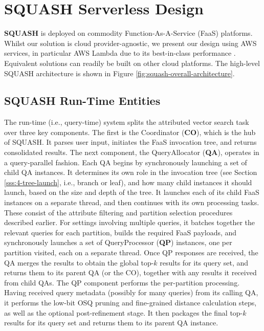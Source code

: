 \section{SQUASH Serverless Design}
\label{s:3-serverless}



\textbf{SQUASH} is deployed on commodity Function-As-A-Service (FaaS) platforms. 
Whilst our solution is cloud provider-agnostic, we present our design using AWS services, in particular AWS Lambda due to its best-in-class performance \cite{Rifai2021, ServerlessSurvey2022}. 
Equivalent solutions can readily be built on other cloud platforms. The high-level SQUASH architecture is shown in Figure \ref{fig:squash-overall-architecture}.
 

\subsection{SQUASH Run-Time Entities}
The run-time (i.e., query-time) system splits the attributed vector search task over three key components. %
The first is the Coordinator (\textbf{CO}), which is the hub of SQUASH. It parses user input, initiates the FaaS invocation tree, and returns consolidated results. The next component, the QueryAllocator (\textbf{QA}), operates in a query-parallel fashion. Each QA begins by synchronously launching a set of child QA instances.
It determines its own role in the invocation tree (see Section \ref{sss:4-tree-launch}, i.e., branch or leaf), and how many child instances it should launch, based on the size and depth of the tree. It launches each of its child FaaS instances on a separate thread, and then continues with its own processing tasks. 
These consist of the attribute filtering and partition selection procedures described earlier. 
For settings involving multiple queries, it batches together the relevant queries for each partition, builds the required FaaS payloads, and synchronously launches a set of QueryProcessor (\textbf{QP}) instances, one per partition visited, each on a separate thread. 
Once QP responses are received, the QA merges the results to obtain the global top-$k$ results for its query set, and returns them to its parent QA (or the CO), together with any results it received from child QAs. 
The QP component performs the per-partition processing. Having received query metadata (possibly for many queries) from its calling QA, it performs the low-bit OSQ pruning and fine-grained distance calculation steps, as well as the optional post-refinement stage. It then packages the final top-$k$ results for its query set and returns them to its parent QA instance. 



